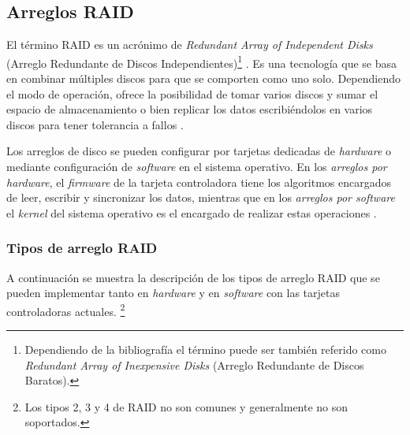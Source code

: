 \newpage
  \subsection {Arreglos RAID}
  \label{Arreglos-RAID}

El t\'{e}rmino \textsc{RAID} es un acr\'{o}nimo de \emph{Redundant Array of Independent Disks} (Arreglo Redundante de Discos Independientes)\footnote{Dependiendo de la bibliograf\'{i}a el t\'{e}rmino puede ser tambi\'{e}n referido como \emph{Redundant Array of Inexpensive Disks} (Arreglo Redundante de Discos Baratos).} \cite{_bytepile.com_????}. Es una tecnolog\'{i}a que se basa en combinar m\'{u}ltiples discos para que se comporten como uno solo. Dependiendo el modo de operaci\'{o}n, ofrece la posibilidad de tomar varios discos y sumar el espacio de almacenamiento o bien replicar los datos escribi\'{e}ndolos en varios discos para tener tolerancia a fallos \cite{_raid_????-2}.

Los arreglos de disco se pueden configurar por tarjetas dedicadas de \textsl{hardware} o mediante configuraci\'{o}n de \textsl{software} en el sistema operativo. En los \emph{arreglos por \textsl{hardware}}, el \textsl{firmware} de la tarjeta controladora tiene los algoritmos encargados de leer, escribir y sincronizar los datos, mientras que en los \emph{arreglos por \textsl{software}} el \textsl{kernel} del sistema operativo es el encargado de realizar estas operaciones \cite{_chapter_????}.

\subsubsection*{Tipos de arreglo RAID}

A continuaci\'{o}n se muestra la descripci\'{o}n de los tipos de arreglo \textsc{RAID} que se pueden implementar tanto en \textit{hardware} y en \textit{software} con las tarjetas controladoras actuales. \footnote{Los tipos 2, 3 y 4 de \textsc{RAID} no son comunes y generalmente no son soportados.}

